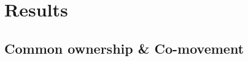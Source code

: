 \documentclass[handout]{beamer}
\begin{document}
	
	\section{Results}
	
	\subsection{Common ownership \& Co-movement}
	
\end{document}
